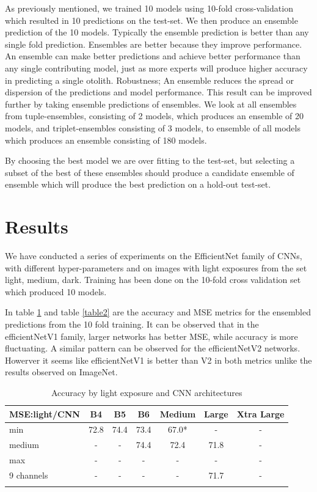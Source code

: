 \documentclass[10pt,letterpaper]{article}
\begin{document}
As previously mentioned, we trained 10 models using 10-fold cross-validation which resulted in 10 predictions on the test-set. We then produce an ensemble prediction of the 10 models. Typically the ensemble prediction is better than any single fold prediction. Ensembles are better because they improve 
performance. An ensemble can make better predictions and achieve better performance than any single contributing model, just as more
experts will produce higher accuracy in predicting a single otolith.
Robustness; An ensemble reduces the spread or dispersion of the predictions and model performance.
This result can be improved further by taking ensemble predictions of ensembles.
We look at all ensembles from tuple-ensembles, consisting of 2 models, which produces an ensemble of 20 models, and triplet-ensembles consisting of 3 models, to ensemble of all models which produces an ensemble consisting of 180 models. 

By choosing the best model we are over fitting to the test-set, but 
selecting a subset of the best of these ensembles should produce a candidate ensemble of ensemble which will produce the best prediction on a hold-out test-set.


\section*{Results}

We have conducted a series of experiments on the EfficientNet family of CNNs, 
with different hyper-parameters and on images with light exposures 
from the set light, medium, dark.
Training has been done on the 10-fold cross validation set which produced 10 models.

In table \ref{table1} and table \ref{table2} are the accuracy and MSE metrics
for the ensembled predictions from the 10 fold training. It can be observed that in the efficientNetV1 family,
larger networks has better MSE, while accuracy is more fluctuating.
A similar pattern can be observed for the efficientNetV2 networks.
Howerver it seems like efficientNetV1 is better than V2 in both metrics unlike
the results observed on ImageNet.

\begin{center}
\begin{table}[hbt!]
\caption{Accuracy by light exposure and CNN architectures}
\begin{tabular}{ |l|c|c|c|c|c|c| }

\hline
MSE:light/CNN & B4 & B5 & B6 & Medium & Large & Xtra Large \\ \hline
min        & 72.8 & 74.4 & 73.4 & 67.0* & - & - \\ 
medium     & - & - & 74.4 & 72.4 & 71.8 & - \\ 
max        & - & - & - & - & - & - \\ 
9 channels & - & - & - & - & 71.7 & - \\ 
\hline
\label{table1}
\end{tabular}
\end{table}
\end{center}
\end{document}
